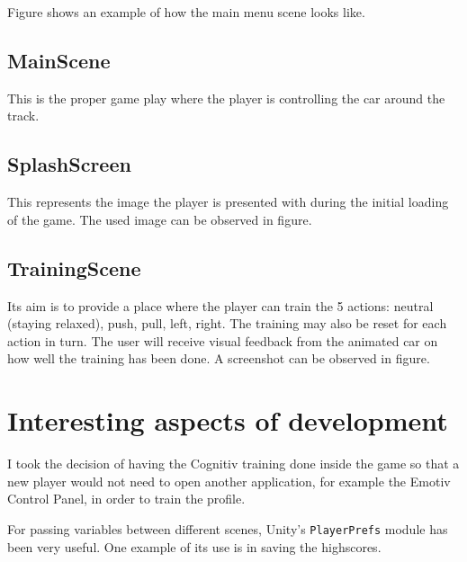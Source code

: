 Figure shows an example of how the main menu scene looks like.

\subsection{MainScene}
This is the proper game play where the player is controlling the car around the track. 

\subsection{SplashScreen}
This represents the image the player is presented with during the initial loading of the game. The used image can be observed in figure.

\subsection{TrainingScene}
Its aim is to provide a place where the player can train the 5 actions: neutral (staying relaxed), push, pull, left, right. The training may also be reset for each action in turn. The user will receive visual feedback from the animated car on how well the training has been done. A screenshot can be observed in figure.

\section{Interesting aspects of development}

I took the decision of having the Cognitiv training done inside the game so that a new player would not need to open another application, for example the Emotiv Control Panel, in order to train the profile.

For passing variables between different scenes, Unity's \texttt{PlayerPrefs} module has been very useful. One example of its use is in saving the highscores. 
